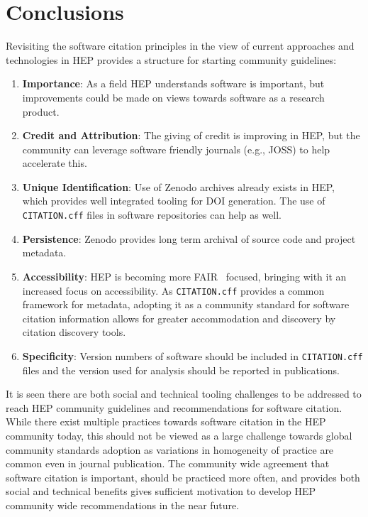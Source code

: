 \section{Conclusions}\label{sec:conclusions}

Revisiting the software citation principles in the view of current approaches and technologies in HEP provides a structure for starting community guidelines:

\begin{enumerate}
    \item \textbf{Importance}: As a field HEP understands software is important, but improvements could be made on views towards software as a research product.
    \item \textbf{Credit and Attribution}: The giving of credit is improving in HEP, but the community can leverage software friendly journals (e.g., JOSS) to help accelerate this.
    \item \textbf{Unique Identification}: Use of Zenodo archives already exists in HEP, which provides well integrated tooling for DOI generation.
The use of \texttt{CITATION.cff} files in software repositories can help as well.
    \item \textbf{Persistence}: Zenodo provides long term archival of source code and project metadata.
    \item \textbf{Accessibility}: HEP is becoming more FAIR~\cite{wilkinson_fair_2016,chue_hong_neil_p_2022_6623556} focused, bringing with it an increased focus on accessibility.
As \texttt{CITATION.cff} provides a common framework for metadata, adopting it as a community standard for software citation information allows for greater accommodation and discovery by citation discovery tools.
    \item \textbf{Specificity}: Version numbers of software should be included in \texttt{CITATION.cff} files and the version used for analysis should be reported in publications.
\end{enumerate}

It is seen there are both social and technical tooling challenges to be addressed to reach HEP community guidelines and recommendations for software citation.
While there exist multiple practices towards software citation in the HEP community today, this should not be viewed as a large challenge towards global community standards adoption as variations in homogeneity of practice are common even in journal publication.
The community wide agreement that software citation is important, should be practiced more often, and provides both social and technical benefits gives sufficient motivation to develop HEP community wide recommendations in the near future.
